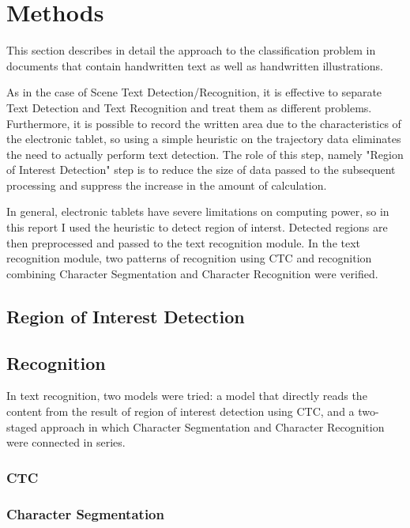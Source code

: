 \section{Methods}

This section describes in detail the approach to the classification problem
in documents that contain handwritten text as well as handwritten illustrations.

As in the case of Scene Text Detection/Recognition, it is effective to separate Text Detection
and Text Recognition and treat them as different problems.
Furthermore, it is possible to record the written area due to the characteristics of the electronic tablet,
so using a simple heuristic on the trajectory data eliminates the need to actually perform text detection.
The role of this step, namely "Region of Interest Detection" step is to reduce the size of data
passed to the subsequent processing and suppress the increase in the amount of calculation.

In general, electronic tablets have severe limitations on computing power, so in this report
I used the heuristic to detect region of interst. Detected regions are then preprocessed
and passed to the text recognition module. In the text recognition module,
two patterns of recognition using CTC and recognition combining
Character Segmentation and Character Recognition were verified.


\subsection{Region of Interest Detection}

\subsection{Recognition}

In text recognition, two models were tried: a model that directly reads the content from the
result of region of interest detection using CTC, and a two-staged approach in which
Character Segmentation and Character Recognition were connected in series.

\subsubsection{CTC}

\subsubsection{Character Segmentation}

